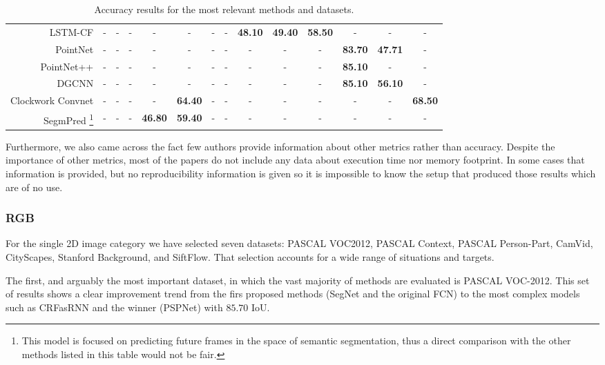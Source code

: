 \begin{table}[!htb]
{\begin{tabular}{|r|c|c|c|c|c|c|c|||c|c|c|||c|c|||c|}
    \acs{LSTM-CF}\cite{Li2016b} & - & - & - & - & - & - & - & \textbf{48.10} & \textbf{49.40} & \textbf{58.50} & - & - & - \\
    PointNet\cite{Qi2016} & - & - & - & - & - & - & - & - & - & - & \textbf{83.70} & \textbf{47.71} & -\\
    PointNet++\cite{Qi2017} & - & - & - & - & - & - & - & - & - & - & \textbf{85.10} & - & -\\
    \ac{DGCNN}\cite{Wang2018} & - & - & - & - & - & - & - & - & - & - & \textbf{85.10} & \textbf{56.10} & -\\
    Clockwork Convnet\cite{Shelhamer2016} & - & - & - & - & \textbf{64.40} & - & - & - & - & - & - & - & \textbf{68.50} \\
    SegmPred \cite{Luc2017} \footnote{This model is focused on predicting future frames in the space of semantic segmentation, thus a direct comparison with the other methods listed in this table would not be fair.} & - & - & - & \textbf{46.80} & \textbf{59.40} & - & - & - & - & - & - & - & - \\
    \hline
  \end{tabular}}
  \caption{Accuracy results for the most relevant methods and datasets.}
  \label{table:semseg:results}
\end{table}

Furthermore, we also came across the fact few authors provide information about other metrics rather than accuracy. Despite the importance of other metrics, most of the papers do not include any data about execution time nor memory footprint. In some cases that information is provided, but no reproducibility information is given so it is impossible to know the setup that produced those results which are of no use.

\subsubsection{\acs{RGB}}

For the single \acs{2D} image category we have selected seven datasets: PASCAL \acs{VOC}2012, PASCAL Context, PASCAL Person-Part, CamVid, CityScapes, Stanford Background, and SiftFlow. That selection accounts for a wide range of situations and targets.

The first, and arguably the most important dataset, in which the vast majority of methods are evaluated is PASCAL \acs{VOC}-2012. This set of results shows a clear improvement trend from the firs proposed methods (SegNet and the original \acs{FCN}) to the most complex models such as \acs{CRF}as\acs{RNN} and the winner (\acs{PSPNet}) with $85.70$ \acs{IoU}.

